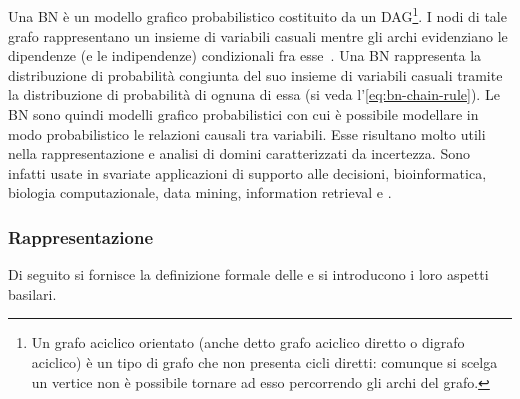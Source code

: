 \subsection{\bn{}}
\label{sec:bn}
Una \acl{BN} è un modello grafico probabilistico costituito da un \acf{DAG}\footnote{\label{note:DAG}Un grafo aciclico orientato (anche detto grafo aciclico diretto o digrafo aciclico) è un tipo di grafo che non presenta cicli diretti: comunque si scelga un vertice non è possibile tornare ad esso percorrendo gli archi del grafo.}. I nodi di tale grafo rappresentano un insieme di variabili casuali mentre gli archi evidenziano le dipendenze (e le indipendenze) condizionali fra esse~\citep{Korb2011}.
Una \acs{BN} rappresenta la distribuzione di probabilità congiunta del suo insieme di variabili casuali tramite la distribuzione di probabilità \cond*{} di ognuna di essa (si veda l'\autoref{eq:bn-chain-rule}).
Le \acs{BN} sono quindi modelli grafico probabilistici con cui è possibile modellare in modo probabilistico le relazioni causali tra variabili. Esse risultano molto utili nella rappresentazione e analisi di domini caratterizzati da incertezza. Sono infatti usate in svariate applicazioni di supporto alle decisioni, bioinformatica, biologia computazionale, data mining, information retrieval e .

\subsubsection{Rappresentazione}
Di seguito si fornisce la definizione formale delle  e si introducono i loro aspetti basilari.

